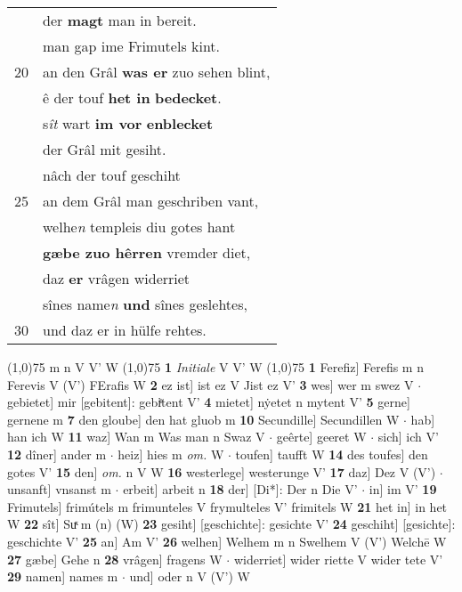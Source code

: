 \documentclass[8pt,a4paper,notitlepage]{article}
\begin{document}
\begin{table}[ht]
\begin{minipage}[t]{0.5\linewidth}
\begin{tabular}{rl}
 & der \textbf{magt} man in bereit.\\ 
 & man gap ime Frimutels kint.\\ 
20 & an den Grâl \textbf{was er} zuo sehen blint,\\ 
 & ê der touf \textbf{het in} \textbf{bedecket}.\\ 
 & s\textit{ît} wart \textbf{im vor} \textbf{enblecket}\\ 
 & der Grâl mit gesiht.\\ 
 & nâch der touf geschiht\\ 
25 & an dem Grâl man geschriben vant,\\ 
 & welhe\textit{n} templeis diu gotes hant\\ 
 & \textbf{gæbe zuo hêrren} vremder diet,\\ 
 & daz \textbf{er} vrâgen widerriet\\ 
 & sînes name\textit{n} \textbf{und} sînes geslehtes,\\ 
30 & und daz er in hülfe rehtes.\\ 
\end{tabular}
\scriptsize
\line(1,0){75} \newline
m n V V' W \newline
\line(1,0){75} \newline
\textbf{1} \textit{Initiale} V V' W  \newline
\line(1,0){75} \newline
\textbf{1} Ferefiz] Ferefis m n Ferevis V (V') FErafis W \textbf{2} ez ist] ist ez V Jist ez V' \textbf{3} wes] wer m swez V  $\cdot$ gebietet] mir [gebitent]: gebiͤtent V' \textbf{4} mietet] nẏetet n mytent V' \textbf{5} gerne] gernene m \textbf{7} den gloube] den hat gluob m \textbf{10} Secundille] Secundillen W  $\cdot$ hab] han ich W \textbf{11} waz] Wan m Was man n Swaz V  $\cdot$ geêrte] geeret W  $\cdot$ sich] ich V' \textbf{12} dîner] ander m  $\cdot$ heiz] hies m \textit{om.} W  $\cdot$ toufen] taufft W \textbf{14} des toufes] den gotes V' \textbf{15} den] \textit{om.} n V W \textbf{16} westerlege] westerunge V' \textbf{17} daz] Dez V (V')  $\cdot$ unsanft] vnsanst m  $\cdot$ erbeit] arbeit n \textbf{18} der] [Di*]: Der n Die V'  $\cdot$ in] im V' \textbf{19} Frimutels] frimútels m frimunteles V frymulteles V' frimitels W \textbf{21} het in] in het W \textbf{22} sît] Suͯ m (n) (W) \textbf{23} gesiht] [geschichte]: gesichte V' \textbf{24} geschiht] [gesichte]: geschichte V' \textbf{25} an] Am V' \textbf{26} welhen] Welhem m n Swelhem V (V') Welchē W \textbf{27} gæbe] Gehe n \textbf{28} vrâgen] fragens W  $\cdot$ widerriet] wider riette V wider tete V' \textbf{29} namen] names m  $\cdot$ und] oder n V (V') W \newline
\end{minipage}
\end{table}
\end{document}
